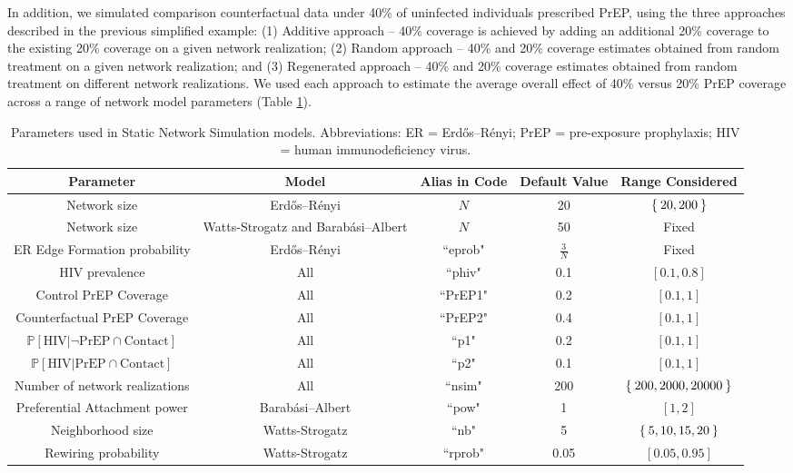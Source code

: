 \documentclass{article}
\theoremstyle{definition}
\begin{document}
In addition, we simulated comparison counterfactual data under 40\% of uninfected individuals prescribed PrEP, using the three approaches described in the previous simplified example: (1) Additive approach -- 40\% coverage is achieved by adding an additional 20\% coverage to the existing 20\% coverage on a given network realization; (2) Random approach -- 40\% and 20\% coverage estimates obtained from random treatment on a given network realization; and (3) Regenerated approach -- 40\% and 20\% coverage estimates obtained from random treatment on different network realizations. We used each approach to estimate the average overall effect of 40\% versus 20\% PrEP coverage across a range of network model parameters (Table \ref{tab:table1}).

\newpage
\begin{landscape}
\begin{table}[H]
    \centering
    \begin{tabular}{|c|c|c|c|c|}
    \hline
    \bf Parameter & \bf Model & \bf Alias in Code & \bf Default Value & \bf Range Considered  \\
    \hline
    Network size & Erdős–Rényi& $N$& 20 & $\Set{20,200}$\\
    \hline
    Network size & Watts-Strogatz and Barabási–Albert & $N$& 50 & Fixed \\
    \hline
    ER Edge Formation probability & Erdős–Rényi & ``eprob" & $\frac{3}{N}$ & Fixed \\
    \hline
    HIV prevalence & All & ``phiv" & 0.1 & $[0.1,0.8]$\\
    \hline
    Control PrEP Coverage & All & ``PrEP1" & 0.2 & $[0.1,1]$\\
    \hline
    Counterfactual PrEP Coverage & All & ``PrEP2" & 0.4 & $[0.1,1]$\\
    \hline
    $\mathbb{P}\left[\text{HIV} \vert \neg \text{PrEP} \cap \text{Contact}\right]$ & All & ``p1" & 0.2 & $[0.1,1]$\\
    \hline
    $\mathbb{P}\left[\text{HIV} \vert \text{PrEP} \cap \text{Contact}\right]$ & All & ``p2"  & 0.1 & $[0.1,1]$\\
    \hline
    Number of network realizations & All & ``nsim" & 200 & $\Set{200,2000,20000}$\\
    \hline
    Preferential Attachment power & Barabási–Albert& ``pow" & 1 & $\left[1,2 \right]$ \\
    \hline
    Neighborhood size & Watts-Strogatz & ``nb" & 5 & $\Set{5,10,15,20}$ \\
    \hline
    Rewiring probability & Watts-Strogatz &  ``rprob" & 0.05 &$\left[0.05, 0.95 \right]$ \\
    \hline
    \end{tabular}
    \caption{Parameters used in Static Network Simulation models. Abbreviations: ER = Erdős–Rényi; PrEP = pre-exposure prophylaxis; HIV = human immunodeficiency virus.}
    \label{tab:table1}
\end{table}
\end{landscape}
\newpage
\end{document}
